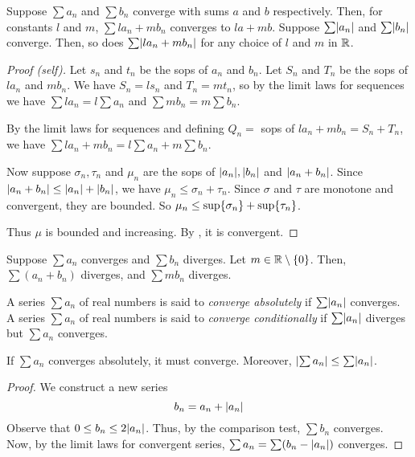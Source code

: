 \begin{thm} \label{thm:series:limit_laws}
    Suppose $\sum a_{n}$ and $\sum b_{n}$ converge with sums $a$ and $b$ respectively.
    Then, for constants $l$ and $m$, $\sum la_{n} + mb_{n}$ converges to $la + mb$.
    Suppose $\sum \abs{a_{n}}$ and $\sum \abs{b_{n}}$ converge.
    Then, so does $\sum \abs{la_{n} + mb_{n}}$ for any choice of $l$ and $m$ in $\mathbb{R}$.
\end{thm}
\begin{proof}[Proof \textcolor{self_proof}{(self)}]
    Let $s_{n}$ and $t_{n}$ be the sops of $a_{n}$ and $b_{n}$.
    Let $S_{n}$ and $T_{n}$ be the sops of $la_{n}$ and $mb_{n}$.
    We have $S_{n} = l s_{n}$ and $T_{n} = m t_{n}$, so by the limit laws for sequences we have $\sum la_{n} = l \sum a_{n}$ and $\sum mb_{n} = m \sum b_{n}$.

    By the limit laws for sequences and defining $Q_{n} =$ sops of $la_{n} + mb_{n} = S_{n} + T_{n}$, we have $\sum la_{n} + mb_{n} = l \sum a_{n} + m \sum b_{n}$.

    Now suppose $\sigma_{n}, \tau_{n}$ and $\mu_{n}$ are the sops of $\abs{a_{n}}, \abs{b_{n}}$ and $\abs{a_{n} + b_{n}}$.
    Since $\abs{a_{n} + b_{n}} \leq \abs{a_{n}} + \abs{b_{n}}$, we have $\mu_{n} \leq \sigma_{n} + \tau_{n}$.
    Since $\sigma$ and $\tau$ are monotone and convergent, they are bounded.
    So $\mu_{n} \leq \sup \set{\sigma_{n}} + \sup \set{\tau_{n}}$.

    Thus $\mu$ is bounded and increasing.
    By , it is convergent.
\end{proof}

\begin{cor} \label{thm:series:limit_laws:divergence}
    Suppose $\sum a_{n}$ converges and $\sum b_{n}$ diverges. Let $m \in \R \setminus \set{0}$. Then, $\sum(a_{n} + b_{n})$ diverges, and $\sum mb_{n}$ diverges.
\end{cor}

\begin{defn} \label{defn:series:absolute_convergence}
    A series $\sum a_{n}$ of real numbers is said to \emph{converge absolutely} if $\sum \abs{a_{n}}$ converges. A series $\sum a_{n}$ of real numbers is said to \emph{converge conditionally} if $\sum \abs{a_{n}}$ diverges but $\sum a_{n}$ converges.
\end{defn}
\begin{thm} \label{thm:series:absolute=>conditional}
    If $\sum a_{n}$ converges absolutely, it must converge. Moreover, $\abs{\sum a_{n}} \leq \sum \abs{a_{n}}$.
\end{thm}
\begin{proof}
    We construct a new series \[
        b_{n} = a_{n} + \abs{a_{n}}
    \] Observe that $0 \leq  b_{n} \leq  2 \abs{a_{n}}$. Thus, by the comparison test, $\sum b_{n}$ converges. Now, by the limit laws for convergent series, $\sum a_{n} = \sum (b_{n} - \abs{a_{n}})$ converges.
\end{proof}


